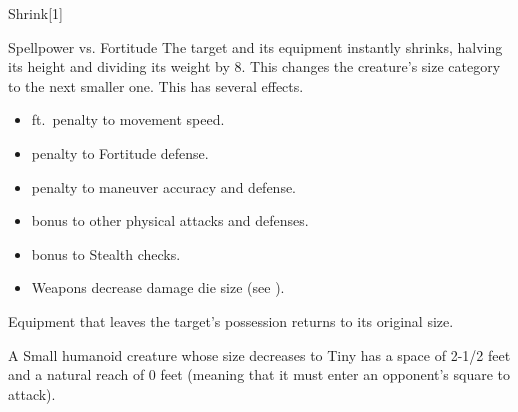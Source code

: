 \begin{spellsection}{Shrink}[1]
    \begin{spellheader}
    \end{spellheader}
    \begin{spellcontent}
        \begin{spelltargetinginfo}
        \end{spelltargetinginfo}
        \begin{spelleffects}
            \begin{spellattack}{Spellpower vs. Fortitude}
                \spellsuccess The target and its equipment instantly shrinks, halving its height and dividing its weight by 8. This changes the creature's size category to the next smaller one. This has several effects.
                \begin{itemize}
                    \item {} ft.\ penalty to movement speed.
                    \item {} penalty to Fortitude defense.
                    \item {} penalty to maneuver accuracy and defense.
                    \item {} bonus to other physical attacks and defenses.
                    \item {} bonus to Stealth checks.
                    \item Weapons decrease damage die size (see ).
                \end{itemize}
                \par Equipment that leaves the target's possession returns to its original size.
            \end{spellattack}
            \spelldur \durshort \dismissable
        \end{spelleffects}
    \end{spellcontent}
    \begin{spellfooter}
        \spellnotes A Small humanoid creature whose size decreases to Tiny has a space of 2-1/2 feet and a natural reach of 0 feet (meaning that it must enter an opponent's square to attack).

        \sizingspellnotes
        \miscastrandom
    \end{spellfooter}
    \begin{spellaugments}
    \end{spellaugments}
\end{spellsection}

